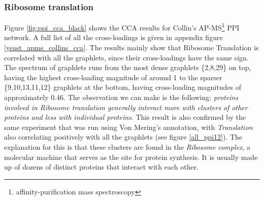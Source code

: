 \subsubsection{Ribosome translation}
Figure \ref{fig:ppi_cca_black} shows the CCA results for Collin's AP-MS\footnote{affinity-purification mass spectroscopy} PPI network. A full list of all the cross-loadings is given in appendix figure \ref{yeast_apms_collins_cca}. The results mainly show that Ribosome Translation is correlated with all the graphlets, since their cross-loadings have the same sign. The spectrum of graphlets runs from the most dense graphlets \{2,8,29\} on top, having the highest cross-loading magnitude of around 1 to the sparser \{9,10,13,11,12\} graphlets at the bottom, having cross-loading magnitudes of approximately 0.46. The observation we can make is the following: \emph{proteins involved in Ribosome translation generally interact more with clusters of other proteins and less with individual proteins}. This result is also confirmed by the same experiment that was run using Von Mering's annotation, with \emph{Translation} also correlating positively with all the graphlets (see figure \ref{all_ppi12}). The explanation for 
this is that these clusters are found in the \emph{Ribosome complex}, a molecular machine that serves as the site for protein synthesis. It is usually made up of dozens of distinct proteins that interact with each other. 


\newcommand{\ccaIndicatorsPPI}{
  \begin{tabular}{>{\large}r}
  \cellcolor{black}\textcolor{ccacol0}{Ribosome translation}\\
  \cellcolor{black}\textcolor{ccacol4}{RNA processing}\\
  \cellcolor{black}\textcolor{ccacol5}{Protein degradation}\\
  \cellcolor{black}\textcolor{ccacol5}{Cell cycle}\\
  \cellcolor{black}\textcolor{ccacol5}{Nuclear transport}\\
  \cellcolor{black}\textcolor{ccacol5}{ER Golgi traffic}\\
  \cellcolor{black}\textcolor{ccacol5}{Protein folding}\\
  \cellcolor{black}\textcolor{ccacol5}{Chromatin segmentation}\\
  \cellcolor{black}\textcolor{ccacol5}{Signalling stress response}\\
  \cellcolor{black}\textcolor{ccacol5}{Cell polarity morphogenesis}\\
  \cellcolor{black}\textcolor{ccacol5}{Chromatin transcription}\\
  \cellcolor{black}\textcolor{ccacol5}{DNA replication}\\
  \cellcolor{black}\textcolor{ccacol5}{Metabolism -- mitochondria}\\
  \cellcolor{black}\textcolor{ccacol6}{Golgi endosome sorting}
  \end{tabular}
}


